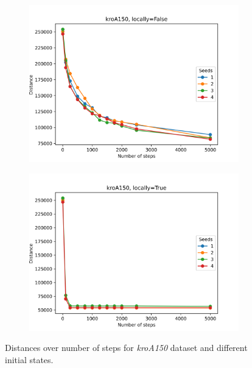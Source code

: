 \begin{figure}[!htb]
	\centering
	\begin{subfigure}{0.45\textwidth}
		\includegraphics[width=\textwidth]{img/kroA150_seeds_locally=False}
	\end{subfigure}
	\begin{subfigure}{0.45\textwidth}
		\includegraphics[width=\textwidth]{img/kroA150_seeds_locally=True}
	\end{subfigure}
	\caption{Distances over number of steps for \textit{kroA150} dataset and different initial states.}
	\label{fig:kroA150_seeds}
\end{figure}